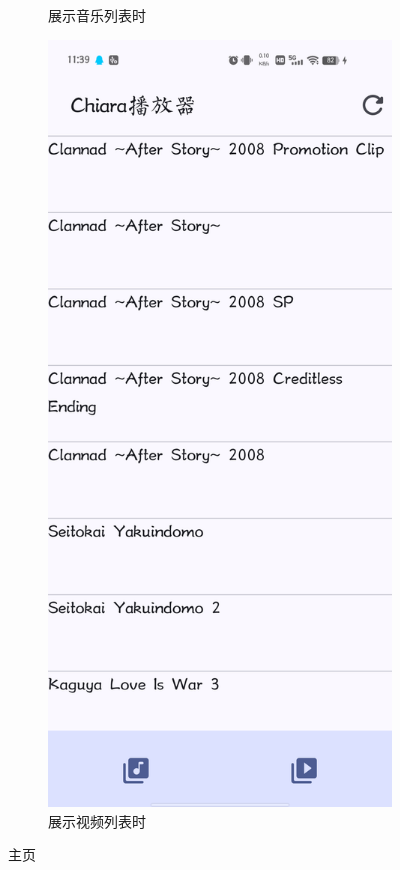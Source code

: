 \documentclass[main.tex]{subfiles}
\begin{document}
\begin{figure}[htbp]
\begin{subfigure}{0.45\linewidth}
        \caption{展示音乐列表时}
    \end{subfigure}
    \begin{subfigure}{0.45\linewidth}
        \centering
        \includegraphics[width=0.9\linewidth]{assets/main-video-page.png}
        \caption{展示视频列表时}
    \end{subfigure}
    \caption{主页}
    \label{fig:main-page}
\end{figure}
\end{document}
